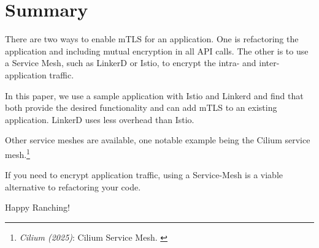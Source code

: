 %
%

\pagebreak
\section{Summary}

\onehalfspacing

There are two ways to enable mTLS for an application. One is refactoring the application and including mutual encryption in all API calls. The other is to use a Service Mesh, such as LinkerD or Istio, to encrypt the intra- and inter-application traffic.

In this paper, we use a sample application with Istio and Linkerd and find that both provide the desired functionality and can add mTLS to an existing application. LinkerD uses less overhead than Istio.

Other service meshes are available, one notable example being the Cilium service mesh.\footnote{\textit{Cilium (2025)}: Cilium Service Mesh. \cite{ciliumMesh}}

If you need to encrypt application traffic, using a Service-Mesh is a viable alternative to refactoring your code.

Happy Ranching!
